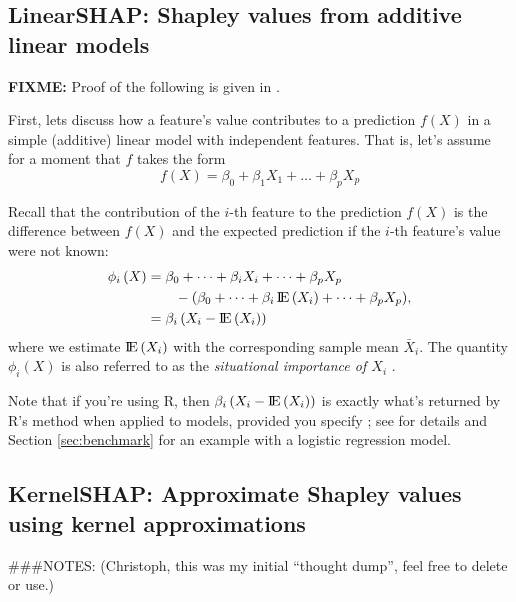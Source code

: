\subsection{LinearSHAP: Shapley values from additive linear models \label{sec:LinearSHAP}}

\textbf{FIXME:} Proof of the following is given in
\citet{aas-2020-explaining}.

First, lets discuss how a feature's value contributes to a prediction
\(f\left(X\right)\) in a simple (additive) linear model with independent
features. That is, let's assume for a moment that \(f\) takes the form
\begin{equation}
\nonumber
  f\left(X\right) = \beta_0 + \beta_1 X_1 + \dots + \beta_p X_p
\end{equation}

Recall that the contribution of the \(i\)-th feature to the prediction
\(f\left(X\right)\) is the difference between \(f\left(X\right)\) and
the expected prediction if the \(i\)-th feature's value were not known:
\begin{equation}
\nonumber
\begin{split}
  \phi_i\left(X\right) &= \beta_0 + \dots + \beta_i X_i + \dots + \beta_p X_p \\ &\quad\quad - \left(\beta_0 + \dots + \beta_i \E\left(X_i\right) + \dots + \beta_p X_p\right) \\
  &= \beta_i \left(X_i - \E\left(X_i\right)\right)
\end{split},
\end{equation} where we estimate \(\E\left(X_i\right)\) with the
corresponding sample mean \(\bar{X}_i\). The quantity
\(\phi_i\left(X\right)\) is also referred to as the
\emph{situational importance of $X_i$} \citep{achen-1982-interpreting}.

Note that if you're using R, then
\(\beta_i \left(X_i - \E\left(X_i\right)\right)\) is exactly what's
returned by R's  method when applied to 
models, provided you specify ; see
 for details and Section \ref{sec:benchmark} for an
example with a logistic regression model.

\subsection{KernelSHAP: Approximate Shapley values using kernel approximations}

\#\#\#NOTES: (Christoph, this was my initial ``thought dump'', feel free
to delete or use.)

